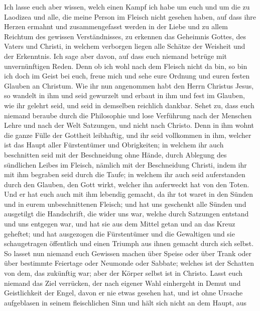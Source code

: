  Ich lasse euch aber wissen, welch einen Kampf ich habe um
euch und um die zu Laodizea und alle, die meine Person im Fleisch nicht
gesehen haben,  auf dass ihre Herzen ermahnt und
zusammengefasst werden in der Liebe und zu allem Reichtum des gewissen
Verständnisses, zu erkennen das Geheimnis Gottes, des Vaters und
Christi,  in welchem verborgen liegen alle Schätze der
Weisheit und der Erkenntnis.  Ich sage aber davon, auf
dass euch niemand betrüge mit unvernünftigen Reden.  Denn
ob ich wohl nach dem Fleisch nicht da bin, so bin ich doch im Geist bei
euch, freue mich und sehe eure Ordnung und euren festen Glauben an
Christum.  Wie ihr nun angenommen habt den Herrn Christus
Jesus, so wandelt in ihm  und seid gewurzelt und erbaut in
ihm und fest im Glauben, wie ihr gelehrt seid, und seid in demselben
reichlich dankbar.  Sehet zu, dass euch niemand beraube
durch die Philosophie und lose Verführung nach der Menschen Lehre und
nach der Welt Satzungen, und nicht nach Christo.  Denn in
ihm wohnt die ganze Fülle der Gottheit leibhaftig,  und
ihr seid vollkommen in ihm, welcher ist das Haupt aller Fürstentümer und
Obrigkeiten;  in welchem ihr auch beschnitten seid mit
der Beschneidung ohne Hände, durch Ablegung des sündlichen Leibes im
Fleisch, nämlich mit der Beschneidung Christi,  indem ihr
mit ihm begraben seid durch die Taufe; in welchem ihr auch seid
auferstanden durch den Glauben, den Gott wirkt, welcher ihn auferweckt
hat von den Toten.  Und er hat euch auch mit ihm lebendig
gemacht, da ihr tot waret in den Sünden und in eurem unbeschnittenen
Fleisch; und hat uns geschenkt alle Sünden  und
ausgetilgt die Handschrift, die wider uns war, welche durch Satzungen
entstand und uns entgegen war, und hat sie aus dem Mittel getan und an
das Kreuz geheftet;  und hat ausgezogen die Fürstentümer
und die Gewaltigen und sie schaugetragen öffentlich und einen Triumph
aus ihnen gemacht durch sich selbst.  So lasset nun
niemand euch Gewissen machen über Speise oder über Trank oder über
bestimmte Feiertage oder Neumonde oder Sabbate;  welches
ist der Schatten von dem, das zukünftig war; aber der Körper selbst ist
in Christo.  Lasst euch niemand das Ziel verrücken, der
nach eigener Wahl einhergeht in Demut und Geistlichkeit der Engel, davon
er nie etwas gesehen hat, und ist ohne Ursache aufgeblasen in seinem
fleischlichen Sinn  und hält sich nicht an dem Haupt, aus

